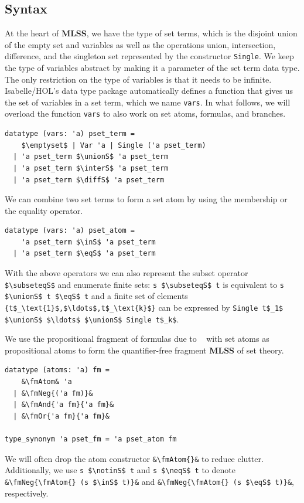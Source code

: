 \documentclass[runningheads]{llncs}
\newcommand{\MLSS}{\textbf{MLSS}}
\newcommand{\unionS}{\sqcup_\text{s}}
\newcommand{\interS}{\sqcap_\text{s}}
\newcommand{\diffS}{-_\text{s}}
\newcommand{\inS}{\in_\text{s}}
\newcommand{\notinS}{\notin_\text{s}}
\newcommand{\eqS}{=_\text{s}}
\newcommand{\neqS}{\neq_\text{s}}
\newcommand{\subseteqS}{\sqsubseteq_\text{s}}
\newcommand{\fmAndSymbol}{\boldsymbol{\land}}
\newcommand{\fmAnd}[2]{#1 $\fmAndSymbol$ #2}
\newcommand{\fmOr}[2]{#1 $\boldsymbol{\lor}$ #2}
\newcommand{\fmNegSymbol}{\boldsymbol{\neg}}
\newcommand{\fmNeg}[1]{$\fmNegSymbol\:$#1}
\newcommand{\fmAtom}{\textbf{A}}
\begin{document}
\subsection{Syntax}
At the heart of \MLSS{}, we have the type of set terms, which is the disjoint union of the empty set and variables as well as the operations union, intersection, difference, and the singleton set represented by the constructor \lstinline!Single!.
We keep the type of variables abstract by making it a parameter of the set term data type.
The only restriction on the type of variables is that it needs to be infinite.
Isabelle/HOL's data type package automatically defines a function that gives us the set of variables in a set term, which we name \lstinline!vars!.
In what follows, we will overload the function \lstinline!vars! to also work on set atoms, formulas, and branches.
\begin{lstlisting}
datatype (vars: 'a) pset_term =
    $\emptyset$ | Var 'a | Single ('a pset_term)
  | 'a pset_term $\unionS$ 'a pset_term
  | 'a pset_term $\interS$ 'a pset_term
  | 'a pset_term $\diffS$ 'a pset_term
\end{lstlisting}
We can combine two set terms to form a set atom by using the membership or the equality operator.
\begin{lstlisting}
datatype (vars: 'a) pset_atom =
    'a pset_term $\inS$ 'a pset_term
  | 'a pset_term $\eqS$ 'a pset_term
\end{lstlisting}
With the above operators we can also represent the subset operator \lstinline!$\subseteqS$! and enumerate finite sets: \lstinline!s $\subseteqS$ t! is equivalent to \lstinline!s $\unionS$ t $\eqS$ t! and a finite set of elements \lstinline!{t$_\text{1}$,$\ldots$,t$_\text{k}$}! can be expressed by \lstinline!Single t$_1$ $\unionS$ $\ldots$ $\unionS$ Single t$_k$!.

We use the propositional fragment of formulas due to \citeauthor{lqe}~\cite{lqe} with set atoms as propositional atoms to form the quantifier-free fragment \MLSS{} of set theory.
\begin{lstlisting}
datatype (atoms: 'a) fm =
    &\fmAtom& 'a
  | &\fmNeg{('a fm)}&
  | &\fmAnd{'a fm}{'a fm}&
  | &\fmOr{'a fm}{'a fm}&

type_synonym 'a pset_fm = 'a pset_atom fm
\end{lstlisting}
We will often drop the atom constructor \lstinline!&\fmAtom{}&! to reduce clutter.
Additionally, we use \lstinline!s $\notinS$ t! and \lstinline!s $\neqS$ t! to denote \lstinline!&\fmNeg{\fmAtom{} (s $\inS$ t)}&! and \lstinline!&\fmNeg{\fmAtom{} (s $\eqS$ t)}&!, respectively.
\end{document}
